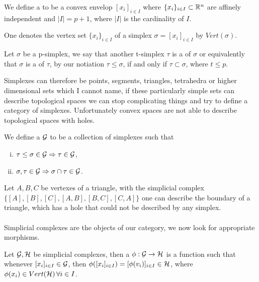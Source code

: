 \documentclass[../1.tex]{subfiles}
\begin{document}
    \begin{defn}
        We define a  to be a convex envelop $[ x_i ]_{i \in I}$
        where $\{x_i\}_{i \in I} \subset \mathbb{R}^n$ are affinely independent and $|I| = p + 1$, where $|I|$ is the cardinality
        of $I$.
    \end{defn}
    
    One denotes the vertex set $\{ x_i \}_{i \in I}$ of a simplex $\sigma = [ x_i ]_{i \in I}$ by $Vert(\sigma)$.
    
    \begin{defn}
        Let $\sigma$ be a p-simplex, we say that another t-simplex $\tau$ is a  of $\sigma$ or equivalently 
        that $\sigma$ is a  of $\tau$, by our notiation $\tau \leq \sigma$, if and only if $\tau \subset \sigma$, where $t \leq p$.
    \end{defn}

    Simplexes can therefore be points, segments, triangles, tetrahedra or higher dimensional sets which I cannot name, if these particularly simple
    sets can describe topological spaces we can stop complicating things and try to define a category of simplexes. Unfortunately convex spaces are
    not able to describe topological spaces with holes.

    \begin{defn}
        We define a  $\mathcal{G}$ to be a collection of simplexes such that
        \begin{enumerate}[(i)]
            \item $ \tau \leq \sigma \in \mathcal{G} \Rightarrow \tau \in \mathcal{G}$,
            \item $ \sigma, \tau \in \mathcal{G} \Rightarrow \sigma \cap \tau \in \mathcal{G}$.
        \end{enumerate}
    \end{defn}

    Let $A,B,C$ be vertexes of a triangle, with the simplicial complex $\{[A],[B],[C],[A,B],[B,C],[C,A]\}$ one can describe the boundary of a triangle, which has
    a hole that could not be described by any simplex.\\
    \hfill \\
    Simplicial complexes are the objects of our category, we now look for appropriate morphisms.

    \begin{defn}
        Let $\mathcal{G},\mathcal{H}$ be simplicial complexes, then a  $\phi : \mathcal{G} \to \mathcal{H}$ is a function 
        such that whenever $[ x_i ]_{i \in I} \in \mathcal{G}$, then $\phi([ x_i ]_{i \in I}) = [ \phi(v_i) ]_{i \in I} \in \mathcal{H}$,
        where $\phi(x_i) \in Vert(\mathcal{H}) \, \forall i \in I$.
    \end{defn}
\end{document}
